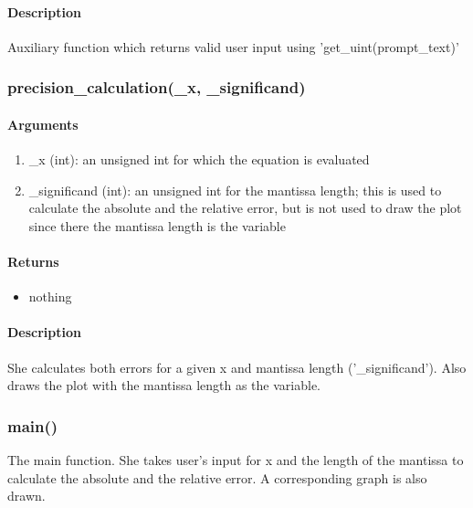 \paragraph*{Description}
Auxiliary function which returns valid user input using 'get\_uint(prompt\_text)'
\subsubsection{precision\_calculation(\_x, \_significand)}
\paragraph*{Arguments}
\begin{enumerate}
    \item \_x (int): an unsigned int for which the equation is evaluated
    \item  \_significand (int): an unsigned int for the mantissa length; this is used to calculate the absolute and the relative error, but is not used to draw the plot since there the mantissa length is the variable
\end{enumerate}
\paragraph*{Returns}
\begin{itemize}
    \item nothing
\end{itemize}
\paragraph*{Description}
She calculates both errors for a given x and mantissa length ('\_significand'). Also draws the plot with the mantissa length as the variable.
\subsubsection{main()}
The main function. She takes user's input for x and the length of the mantissa to calculate the absolute and the relative error. A corresponding graph is also drawn.